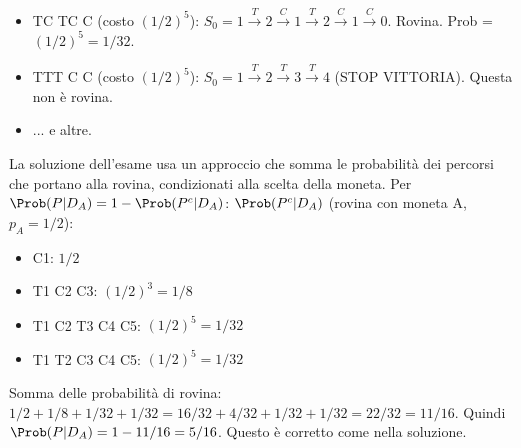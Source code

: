 \begin{example}
\begin{itemize}
    \item TC TC C (costo $(1/2)^5$): $S_0=1 \xrightarrow{T} 2 \xrightarrow{C} 1 \xrightarrow{T} 2 \xrightarrow{C} 1 \xrightarrow{C} 0$. Rovina. Prob = $(1/2)^5 = 1/32$.
    \item TTT C C (costo $(1/2)^5$): $S_0=1 \xrightarrow{T} 2 \xrightarrow{T} 3 \xrightarrow{T} 4$ (STOP VITTORIA). Questa non è rovina.
    \item ... e altre.
\end{itemize}
La soluzione dell'esame usa un approccio che somma le probabilità dei percorsi che portano alla rovina, condizionati alla scelta della moneta.
Per $\Prob(P|D_A) = 1 - \Prob(P^c|D_A)$:
$\Prob(P^c|D_A)$ (rovina con moneta A, $p_A=1/2$):
\begin{itemize}
    \item C1: $1/2$
    \item T1 C2 C3: $(1/2)^3 = 1/8$
    \item T1 C2 T3 C4 C5: $(1/2)^5 = 1/32$
    \item T1 T2 C3 C4 C5: $(1/2)^5 = 1/32$
\end{itemize}
Somma delle probabilità di rovina: $1/2 + 1/8 + 1/32 + 1/32 = 16/32 + 4/32 + 1/32 + 1/32 = 22/32 = 11/16$.
Quindi $\Prob(P|D_A) = 1 - 11/16 = 5/16$. Questo è corretto come nella soluzione.


\end{example}
